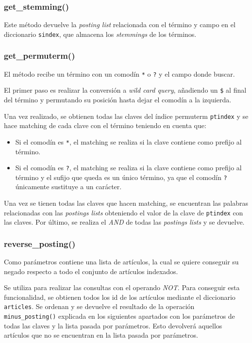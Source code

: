 \documentclass[12pt,a4paper]{article}
\begin{document}
\subsubsection{get\_stemming()}
Este método devuelve la \textit{posting list} relacionada con el término y campo en el diccionario \texttt{sindex}, que almacena los \textit{stemmings} de los términos.

\subsubsection{get\_permuterm()}
El método recibe un término con un comodín \texttt{*} o \texttt{?} y el campo donde buscar.

El primer paso es realizar la conversión a \textit{wild card query}, añadiendo un \texttt{\$} al final del término y permutando su posición hasta dejar el comodín a la izquierda.

Una vez realizado, se obtienen todas las claves del índice permuterm \texttt{ptindex} y se hace matching de cada clave con el término teniendo en cuenta que:
\begin{itemize}
  \item Si el comodín es \texttt{*}, el matching se realiza si la clave contiene como prefijo al término.
  \item Si el comodín es \texttt{?}, el matching se realiza si la clave contiene como prefijo al término y el sufijo que queda es un único término, ya que el comodín \texttt{?} únicamente sustituye a un carácter.
\end{itemize}

Una vez se tienen todas las claves que hacen matching, se encuentran las palabras relacionadas con las \textit{postings lists} obteniendo el valor de la clave de \texttt{ptindex} con las claves. Por último, se realiza el \textit{AND} de todas las \textit{postings lists} y se devuelve.

\subsubsection{reverse\_posting()}
Como parámetros contiene una lista de artículos, la cual se quiere conseguir su negado respecto a todo el conjunto de artículos indexados.

Se utiliza para realizar las consultas con el operando \textit{NOT}. Para conseguir esta funcionalidad, se obtienen todos los id de los artículos mediante el diccionario \texttt{articles}. Se ordenan y se devuelve el resultado de la operación \texttt{minus\_posting()} explicada en los siguientes apartados con los parámetros de todas las claves y la lista pasada por parámetros. Esto devolverá aquellos artículos que no se encuentran en la lista pasada por parámetros.
\end{document}
